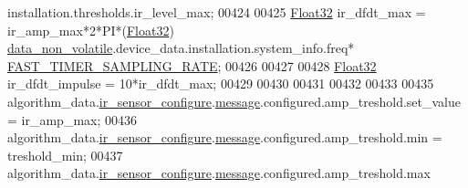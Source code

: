 \begin{DoxyCode}
{{{{{      installation.thresholds.ir\_level\_max;
00424 
00425      \hyperlink{a00072_a87d38f886e617ced2698fc55afa07637}{Float32} ir\_dfdt\_max     = ir\_amp\_max*2*PI*(\hyperlink{a00072_a87d38f886e617ced2698fc55afa07637}{Float32})
      \hyperlink{a00060_a76ac5f917f5308dcd83de0d7c94559fb}{data\_non\_volatile}.device\_data.installation.system\_info.freq*
      \hyperlink{a00021_a3a4dcb8af26a561d90607a41a3745806}{FAST\_TIMER\_SAMPLING\_RATE};
00426 
00427 
00428      \hyperlink{a00072_a87d38f886e617ced2698fc55afa07637}{Float32} ir\_dfdt\_impulse = 10*ir\_dfdt\_max;
00429     
00430 
00431 
00432 
00433 
00435     algorithm\_data.\hyperlink{a00016_ac6483a3473f539f671660ae458d889d3}{ir\_sensor\_configure}.\hyperlink{a00018_a32952acc732e2f16aad59fe0804da5bf}{message}.configured.amp\_treshold.set\_value 
         = ir\_amp\_max;
00436     algorithm\_data.\hyperlink{a00016_ac6483a3473f539f671660ae458d889d3}{ir\_sensor\_configure}.\hyperlink{a00018_a32952acc732e2f16aad59fe0804da5bf}{message}.configured.amp\_treshold.min       
         = treshold\_min;
00437     algorithm\_data.\hyperlink{a00016_ac6483a3473f539f671660ae458d889d3}{ir\_sensor\_configure}.\hyperlink{a00018_a32952acc732e2f16aad59fe0804da5bf}{message}.configured.amp\_treshold.max       
         
}}}}}
\end{DoxyCode}
